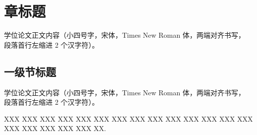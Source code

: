 \documentclass[mode = thesis, fontset = lxgw]{westlakethesis}
\begin{document}
\maketitle

\frontmatter
\begin{abstract}[cn]
  随着 XXXXX 的发展，XXX 问题日益突出。本文提出了一种新型算法模型，融合了三项关键技术，
  通过实验设计，在数据集上验证了方法的有效性，取得了指标的性能提升。研究表明，
  该方法能够明显优势，为该问题提供了新的解决方法。
  XXX XXX XXX XXX XXX XXX XXX XXX XXX XXX XXX XXX XXX XXX XXX
  XXX XXX XXX XXX XXX XXX XXX XXX XXX XXX XXX XXX XXX XXX XXX
  XXX XXX XXX XXX XXX XXX XXX XXX XXX XXX XXX XXX XXX XXX XX.\par
  \zhlipsum[1]
\end{abstract}

\begin{abstract}[en]
  With the rapid development of financial technology (FinTech), traditional
  credit risk assessment models face challenges in processing large-scale,
  heterogeneous data. This study proposes a novel ensemble learning framework
  that combines deep neural networks with interpretable machine learning models
  to improve prediction accuracy while maintaining transparency.
  XXX XXX XXX XXX XXX XXX XXX XXX XXX XXX XXX XXX XXX XXX XXX
  XXX XXX XXX XXX XXX XXX XXX XXX XXX XXX XXX XXX XXX XXX XXX
  XXX XXX XXX XXX XXX XXX XXX XXX XXX XXX XXX XXX XXX XXX XX.\par
  \lipsum[1]
\end{abstract}

\tableofcontents
\mainmatter

\chapter{章标题}

学位论文正文内容（小四号字，宋体，Times New Roman 体，两端对齐书写，
段落首行左缩进 2 个汉字符）\cite{yang2009cernet}。

\section{一级节标题}

学位论文正文内容（小四号字，宋体，Times New Roman 体，两端对齐书写，
段落首行左缩进 2 个汉字符）。

XXX XXX XXX XXX XXX XXX XXX XXX XXX XXX XXX XXX XXX XXX XXX
XXX XXX XXX XXX XX\cite{bonjour2009minerals}.
\end{document}
